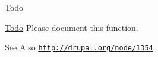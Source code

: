 \begin{DoxyRefDesc}{Todo}
\item[\hyperlink{todo__todo000119}{Todo}]Please document this function. \end{DoxyRefDesc}
\begin{DoxySeeAlso}{See Also}
\href{http://drupal.org/node/1354}{\tt http\-://drupal.\-org/node/1354} 
\end{DoxySeeAlso}
